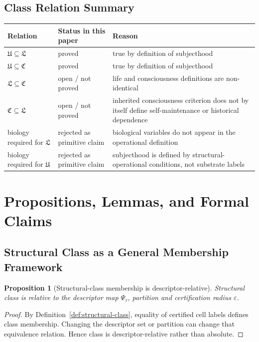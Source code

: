 \documentclass[11pt,a4paper]{article}
\newtheorem{proposition}{Proposition}[section]
\theoremstyle{definition}
\newcommand{\PsiVec}{\Psi}
\newcommand{\eps}{\varepsilon}
\newcommand{\LifeClass}{\mathfrak{L}}
\newcommand{\ConClass}{\mathfrak{C}}
\newcommand{\SubClass}{\mathfrak{U}}
\begin{document}
\subsection{Class Relation Summary}
\begin{center}
\renewcommand{\arraystretch}{1.16}
\setlength{\tabcolsep}{5pt}
\begin{tabularx}{\linewidth}{@{}lY Y@{}}
\toprule
Relation & Status in this paper & Reason \\
\midrule
$\SubClass \subseteq \LifeClass$ & proved & true by definition of subjecthood \\
$\SubClass \subseteq \ConClass$ & proved & true by definition of subjecthood \\
$\LifeClass \subseteq \ConClass$ & open / not proved & life and consciousness definitions are non-identical \\
$\ConClass \subseteq \LifeClass$ & open / not proved & inherited consciousness criterion does not by itself define self-maintenance or historical dependence \\
biology required for $\LifeClass$ & rejected as primitive claim & biological variables do not appear in the operational definition \\
biology required for $\SubClass$ & rejected as primitive claim & subjecthood is defined by structural-operational conditions, not substrate labels \\
\bottomrule
\end{tabularx}
\end{center}

\section{Propositions, Lemmas, and Formal Claims}
\subsection{Structural Class as a General Membership Framework}
\begin{proposition}[Structural-class membership is descriptor-relative]
Structural class is relative to the descriptor map $\PsiVec_\tau$, partition and certification radius $\eps$.
\end{proposition}

\begin{proof}
By Definition~\ref{def:structural-class}, equality of certified cell labels defines class membership. Changing the descriptor set or partition can change that equivalence relation. Hence class is descriptor-relative rather than absolute.
\end{proof}
\end{document}
